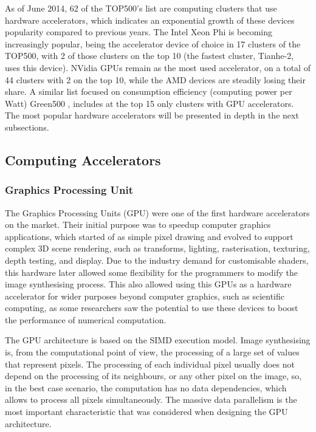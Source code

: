 As of June 2014, 62 of the TOP500’s list \cite{TOP500} are computing clusters that use hardware accelerators, which indicates an exponential growth of these devices popularity compared to previous years. The Intel Xeon Phi is becoming increasingly popular, being the accelerator device of choice in 17 clusters of the TOP500, with 2 of those clusters on the top 10 (the fastest cluster, Tianhe-2, uses this device). NVidia GPUs remain as the most used accelerator, on a total of 44 clusters with 2 on the top 10, while the AMD devices are steadily losing their share. A similar list focused on consumption efficiency (computing power per Watt) Green500 \cite{GREEN500}, includes at the top 15 only clusters with \nvidia GPU accelerators. The most popular hardware accelerators will be presented in depth in the next subsections.

\subsection{Computing Accelerators}
\label{hardware}

\subsubsection*{Graphics Processing Unit}
\label{gpu}

The Graphics Processing Units (GPU) were one of the first hardware accelerators on the market. Their initial purpose was to speedup computer graphics applications, which started of as simple pixel drawing and evolved to support complex 3D scene rendering, such as transforms, lighting, rasterisation, texturing, depth testing, and display. Due to the industry demand for customisable shaders, this hardware later allowed some flexibility for the programmers to modify the image synthesising process. This also allowed using this GPUs as a hardware accelerator for wider purposes beyond computer graphics, such as scientific computing, as some researchers saw the potential to use these devices to boost the performance of numerical computation.

The GPU architecture is based on the SIMD execution model. Image synthesising is, from the computational point of view, the processing of a large set of values that represent pixels. The processing of each individual pixel usually does not depend on the processing of its neighbours, or any other pixel on the image, so, in the best case scenario, the computation has no data dependencies, which allows to process all pixels simultaneously. The massive data parallelism is the most important characteristic that was considered when designing the GPU architecture.

